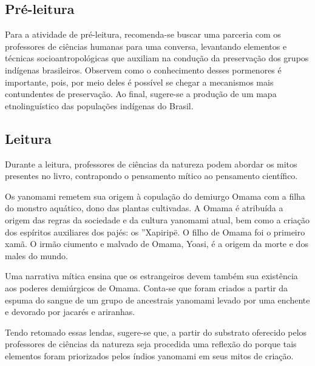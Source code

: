 \documentclass[12pt]{extarticle}
\begin{document}

\subsection{Pré-leitura}

Para a atividade de pré-leitura, recomenda-se buscar uma
parceria com os professores de ciências humanas para uma conversa,
levantando elementos e técnicas socioantropológicas que auxiliam na
condução da preservação dos grupos indígenas brasileiros. Observem como
o conhecimento desses pormenores é importante, pois, por meio deles é
possível se chegar a mecanismos mais contundentes de preservação. Ao
final, sugere-se a produção de um mapa etnolinguístico das populações
indígenas do Brasil.


\subsection{Leitura}

Durante a leitura, professores de ciências da natureza podem
abordar os mitos presentes no livro, contrapondo o pensamento mítico ao
pensamento científico.

Os yanomami remetem sua origem à copulação do demiurgo Omama com
a filha do monstro aquático, dono das plantas cultivadas. A Omama é
atribuída a origem das regras da sociedade e da cultura yanomami atual,
bem como a criação dos espíritos auxiliares dos pajés: os ''Xapiripë. O
filho de Omama foi o primeiro xamã. O irmão ciumento e malvado de Omama,
Yoasi, é a origem da morte e dos males do mundo.

Uma narrativa mítica ensina que os estrangeiros devem também sua
existência aos poderes demiúrgicos de Omama. Conta-se que foram criados
a partir da espuma do sangue de um grupo de ancestrais yanomami levado
por uma enchente e devorado por jacarés e ariranhas.

Tendo retomado essas lendas, sugere-se que, a partir do
substrato oferecido pelos professores de ciências da natureza seja
procedida uma reflexão do porque tais elementos foram priorizados pelos
índios yanomami em seus mitos de criação.

\end{document}
